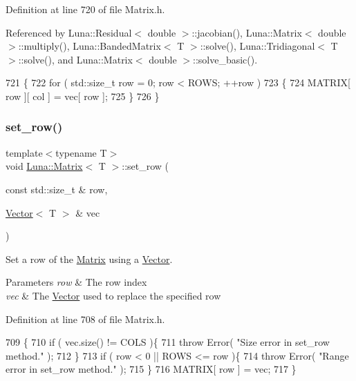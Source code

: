 Definition at line 720 of file Matrix.\+h.



Referenced by Luna\+::\+Residual$<$ double $>$\+::jacobian(), Luna\+::\+Matrix$<$ double $>$\+::multiply(), Luna\+::\+Banded\+Matrix$<$ T $>$\+::solve(), Luna\+::\+Tridiagonal$<$ T $>$\+::solve(), and Luna\+::\+Matrix$<$ double $>$\+::solve\+\_\+basic().


\begin{DoxyCode}
721   \{
722     \textcolor{keywordflow}{for} ( std::size\_t row = 0; row < ROWS; ++row )
723     \{
724       MATRIX[ row ][ col ] = vec[ row ];
725     \}
726   \}
\end{DoxyCode}
\mbox{\label{classLuna_1_1Matrix_aa276b72f2edfc8bb280ca051177b4536}} 
\subsubsection{\texorpdfstring{set\+\_\+row()}{set\_row()}}
{\footnotesize\ttfamily template$<$typename T$>$ \\
void \hyperlink{classLuna_1_1Matrix}{Luna\+::\+Matrix}$<$ T $>$\+::set\+\_\+row (\begin{DoxyParamCaption}\item[{const std\+::size\+\_\+t \&}]{row,  }\item[{\hyperlink{classLuna_1_1Vector}{Vector}$<$ T $>$ \&}]{vec }\end{DoxyParamCaption})\hspace{0.3cm}{\ttfamily [inline]}}



Set a row of the \hyperlink{classLuna_1_1Matrix}{Matrix} using a \hyperlink{classLuna_1_1Vector}{Vector}. 


\begin{DoxyParams}{Parameters}
{\em row} & The row index \\
\hline
{\em vec} & The \hyperlink{classLuna_1_1Vector}{Vector} used to replace the specified row \\
\hline
\end{DoxyParams}


Definition at line 708 of file Matrix.\+h.


\begin{DoxyCode}
709   \{
710     \textcolor{keywordflow}{if} ( vec.size() != COLS )\{
711       \textcolor{keywordflow}{throw} Error( \textcolor{stringliteral}{"Size error in set\_row method."} );
712     \}
713     \textcolor{keywordflow}{if} ( row < 0 || ROWS <= row )\{
714       \textcolor{keywordflow}{throw} Error( \textcolor{stringliteral}{"Range error in set\_row method."} );
715     \}
716     MATRIX[ row ] = vec;
717   \}
\end{DoxyCode}
\mbox{\label{classLuna_1_1Matrix_abc78c81c129e2bb7ca9f6ee6db2611a9}} 
